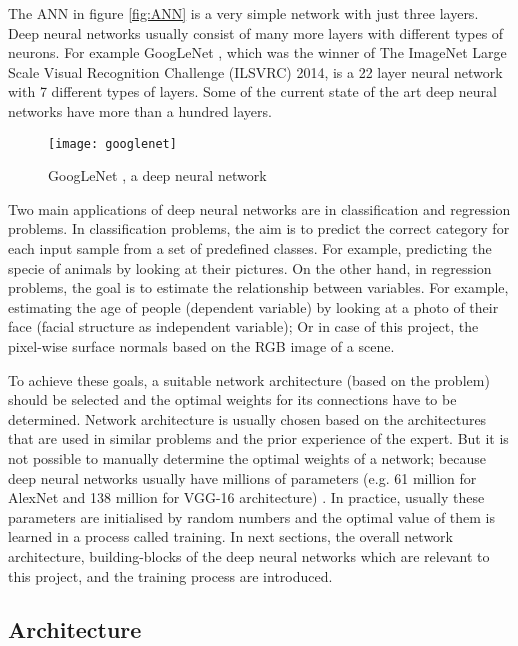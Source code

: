 The ANN in figure \ref{fig:ANN} is a very simple network with just three layers. Deep neural networks usually consist of many more layers with different types of neurons. For example GoogLeNet \cite{googlenet}, which was the winner of The ImageNet Large Scale Visual Recognition Challenge (ILSVRC) 2014, is a 22 layer neural network with 7 different types of layers. Some of the current state of the art deep neural networks have more than a hundred layers. 

\begin{figure}
    \centering
    \texttt{[image: googlenet]}
    \caption{GoogLeNet \cite{googlenet}, a deep neural network }
    \label{fig:googlenet}
\end{figure}

Two main applications of deep neural networks are in classification and regression problems. In classification problems, the aim is to predict the correct category for each input sample from a set of predefined classes. For example, predicting the specie of animals by looking at their pictures. On the other hand, in regression problems, the goal is to estimate the relationship between variables. For example, estimating the age of people (dependent variable) by looking at a photo of their face (facial structure as independent variable); Or in case of this project, the pixel-wise surface normals based on the RGB image of a scene. 

To achieve these goals, a suitable network architecture (based on the problem) should be selected and the optimal weights for its connections have to be determined. Network architecture is usually chosen based on the architectures that are used in similar problems and the prior experience of the expert.  But it is not possible to manually determine the optimal weights of a network; because deep neural networks usually have millions of parameters (e.g. 61 million for AlexNet \cite{alexnet} and 138 million for VGG-16 \cite{vgg} architecture) \cite{dnnparameters}. In practice, usually these parameters are initialised by random numbers and the optimal value of them is learned in a process called training. In next sections, the overall network architecture, building-blocks of the deep neural networks which are relevant to this project, and the training process are introduced.  

\subsection{Architecture}


